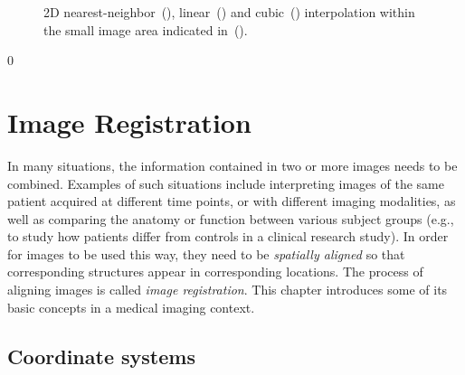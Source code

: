 \documentclass[10pt,twoside]{book}
\def\hideChapterRegistration{0}
\begin{document}
\begin{figure}
\begin{subfigure}[b]{0.48\textwidth}
     \caption{}
     \label{fig:interpolation2D_BSplineOrder3}
  \end{subfigure}
  \caption{2D nearest-neighbor~(), linear~() and cubic~() interpolation within the small image area indicated in~().}
  \label{fig:interpolation2D}
\end{figure}


\fi

\if\hideChapterRegistration0
\chapter{Image Registration}
\label{chap:registration}


\noindent
In many situations, the information contained in two or more images needs to be combined. Examples of such situations include interpreting images of the same patient acquired at different time points, or with different imaging modalities, as well as comparing the anatomy or function between various subject groups (e.g., to study how patients differ from controls in a clinical research study).
%
In order for images to be used this way, they need to be \emph{spatially aligned} so that corresponding structures appear in corresponding locations. The process of aligning images is called \emph{image registration}. This chapter introduces some of its basic concepts in a medical imaging context.


\section{Coordinate systems}
\end{document}
